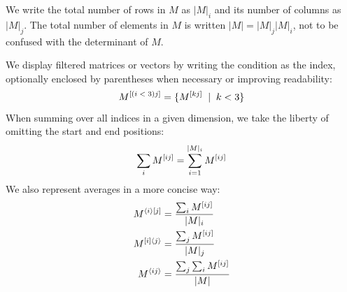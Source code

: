 We write
the total number of rows in $M$ as $|M|_i$ and its number of columns as $|M|_j$.
The total number of elements in $M$ is written $|M| = |M|_j|M|_i$, not to be
confused with the determinant of $M$.

We display filtered matrices or vectors by writing the condition as the index,
optionally enclosed by parentheses when necessary or improving readability:
%
\begin{equation*}
    M^{[(i\;<\;3)j]} = \{M^{[kj]}\;\mid \; k < 3\}
    \label{eq:filter_notation}
\end{equation*}
%
When summing over all indices in a given dimension, we take the liberty of
omitting the start and end positions:
%
\begin{equation*}
    \sum_i M^{[ij]} = \sum_{i=1}^{|M|_i} M^{[ij]}
    \label{eq:sum_notation}
\end{equation*}
%
We also represent averages in a more concise way:
\begin{equation}
    \begin{split}
        M^{\langle i\rangle [j]}
            &= \frac{\sum_i M^{[ij]}} {|M|_i}\\
        M^{[i] \langle j\rangle}
            &= \frac{\sum_j M^{[ij]}} {|M|_j}\\
        M^{\langle ij \rangle}
            &= \frac{\sum_j \sum_i M^{[ij]}} {|M|}
    \end{split}
    \label{eq:avg_notation}
\end{equation}

